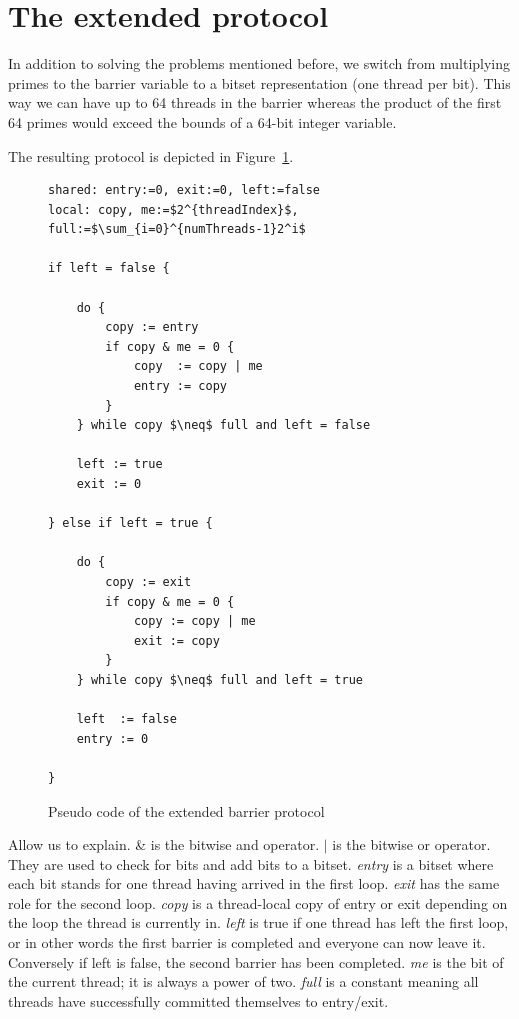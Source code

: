 \documentclass[a4paper, 10pt]{article}
\begin{document}
\section{The extended protocol}
In addition to solving the problems mentioned before, we switch from multiplying primes to the barrier variable to a bitset representation (one thread per bit). This way we can have up to 64 threads in the barrier whereas the product of the first 64 primes would  exceed the bounds of a 64-bit integer variable.

The resulting protocol is depicted in Figure~\ref{fig:barrier-source-code}.

\begin{figure}[htb]
	\centering
	\begin{lstlisting}[mathescape]
shared: entry:=0, exit:=0, left:=false
local: copy, me:=$2^{threadIndex}$, full:=$\sum_{i=0}^{numThreads-1}2^i$

if left = false {

	do {
		copy := entry
		if copy & me = 0 {
			copy  := copy | me
			entry := copy
		}
	} while copy $\neq$ full and left = false

	left := true
	exit := 0

} else if left = true {

	do {
		copy := exit
		if copy & me = 0 {
			copy := copy | me
			exit := copy
		}
	} while copy $\neq$ full and left = true

	left  := false
	entry := 0

}
	\end{lstlisting}
	\caption{Pseudo code of the extended barrier protocol}
	\label{fig:barrier-source-code}
\end{figure}

Allow us to explain. \& is the bitwise and operator. $|$ is the bitwise or operator. They are used to check for bits and add bits to a bitset. \emph{entry} is a bitset where each bit stands for one thread having arrived in the first loop. \emph{exit} has the same role for the second loop. \emph{copy} is a thread-local copy of entry or exit depending on the loop the thread is currently in. \emph{left} is true if one thread has left the first loop, or in other words the first barrier is completed and everyone can now leave it. Conversely if left is false, the second barrier has been completed. \emph{me} is the bit of the current thread; it is always a power of two. \emph{full} is a constant meaning all threads have successfully committed themselves to entry/exit.
\end{document}
